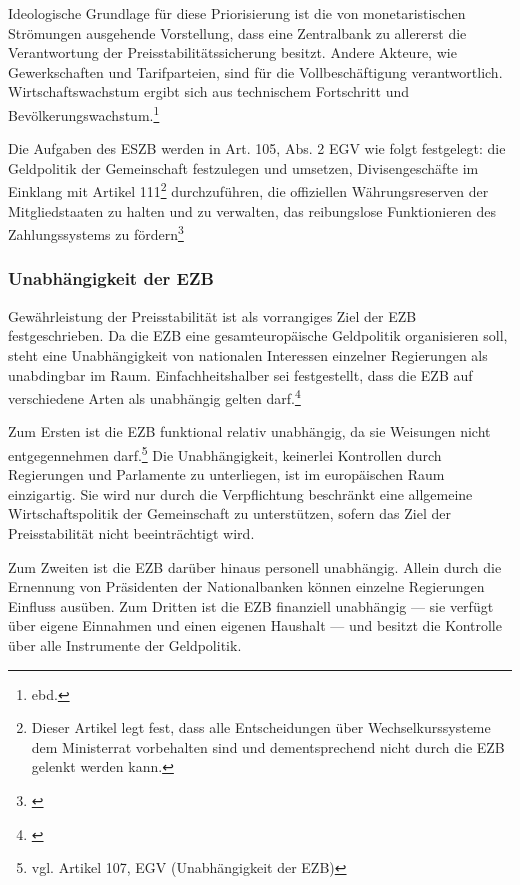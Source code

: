 \documentclass[
        onecolumn,
        a4paper,
        abstracton,
        parskip=half
        ,final
        ]{scrartcl}
\begin{document}
Ideologische Grundlage f{\"u}r diese Priorisierung ist die von monetaristischen Str{\"o}mungen ausgehende Vorstellung, dass eine Zentralbank zu allererst die Verantwortung der Preisstabilit{\"a}tssicherung besitzt. Andere Akteure, wie Gewerkschaften und Tarifparteien, sind f{\"u}r die Vollbesch{\"a}ftigung verantwortlich. Wirtschaftswachstum ergibt sich aus technischem Fortschritt und Bev{\"o}lkerungswachstum.\footnote[37]{ebd.}


Die Aufgaben des \ac{ESZB} werden in Art. 105, Abs. 2 \ac{EGV} wie folgt festgelegt: die Geldpolitik der Gemeinschaft festzulegen und umsetzen, Divisengesch{\"a}fte im Einklang mit Artikel 111\footnote[38]{Dieser Artikel legt fest, dass alle Entscheidungen {\"u}ber Wechselkurssysteme dem Ministerrat vorbehalten sind und dementsprechend nicht durch die EZB gelenkt werden kann.} durchzuf{\"u}hren, die offiziellen W{\"a}hrungsreserven der Mitgliedstaaten zu halten und zu verwalten, das reibungslose Funktionieren des Zahlungssystems zu f{\"o}rdern\footnote[39]{\citep*[vgl.][S.555]{Basseler2010}}





\subsubsection{Unabh{\"a}ngigkeit der EZB}  %

Gew{\"a}hrleistung der Preisstabilit{\"a}t ist als vorrangiges Ziel der EZB festgeschrieben. Da die EZB eine gesamteurop{\"a}ische Geldpolitik organisieren soll, steht eine Unabh{\"a}ngigkeit von nationalen Interessen einzelner Regierungen als unabdingbar im Raum. Einfachheitshalber sei festgestellt, dass die EZB auf verschiedene Arten als unabh{\"a}ngig gelten darf.\footnote[40]{\citep*[vgl.][S.555-557]{Basseler2010}}

Zum Ersten ist die EZB funktional relativ unabh{\"a}ngig, da sie Weisungen nicht entgegennehmen darf.\footnote[41]{vgl. Artikel 107, \ac{EGV} (Unabh{\"a}ngigkeit der EZB) } Die Unabh{\"a}ngigkeit, keinerlei Kontrollen durch Regierungen und Parlamente zu unterliegen, ist im europ{\"a}ischen Raum einzigartig. Sie wird nur durch die Verpflichtung beschr{\"a}nkt eine allgemeine Wirtschaftspolitik der Gemeinschaft zu unterst{\"u}tzen, sofern das Ziel der Preisstabilit{\"a}t nicht beeintr{\"a}chtigt wird.

Zum Zweiten ist die EZB dar{\"u}ber hinaus personell unabh{\"a}ngig. Allein durch die Ernennung von Pr{\"a}sidenten der Nationalbanken k{\"o}nnen einzelne Regierungen Einfluss aus{\"u}ben. Zum Dritten ist die EZB finanziell unabh{\"a}ngig --- sie verf{\"u}gt {\"u}ber eigene Einnahmen und einen eigenen Haushalt --- und besitzt die Kontrolle {\"u}ber alle Instrumente der Geldpolitik.
\end{document}
